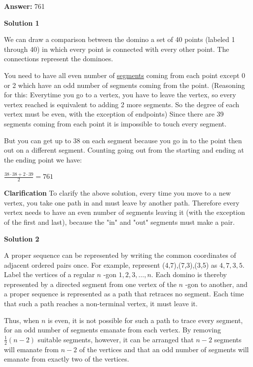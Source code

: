 \begin{enumerate}
 \textbf{Answer: }761



\textbf{Solution 1}

We can draw a comparison between the domino a set of 40 points (labeled 1 through 40) in which every point is connected with every other point. The connections represent the dominoes.

 You need to have all even number of \href{https://artofproblemsolving.com/wiki/index.php?title=Segment}{segments} coming from each point except 0 or 2 which have an odd number of segments coming from the point. (Reasoning for this: Everytime you go to a vertex, you have to leave the vertex, so every vertex reached is equivalent to adding 2 more segments. So the degree of each vertex must be even, with the exception of endpoints) Since there are 39 segments coming from each point it is impossible to touch every segment.

 But you can get up to 38 on each segment because you go in to the point then out on a different segment.  Counting going out from the starting and ending at the ending point we have:

 $\frac{38\cdot 38 + 2\cdot 39}2 = \boxed{761}$

 \textbf{Clarification} To clarify the above solution, every time you move to a new vertex, you take one path in and must leave by another path. Therefore every vertex needs to have an even number of segments leaving it (with the exception of the first and last), because the "in" and "out" segments must make a pair.

 



\textbf{Solution 2}

A proper sequence can be represented by writing the common coordinates of adjacent ordered pairs once. For example, represent (4,7),(7,3),(3,5) as $4,7,3,5 .$ Label the vertices of a regular $n$ -gon $1,2,3, \ldots, n .$ Each domino is thereby represented by a directed segment from one vertex of the $n$ -gon to another, and a proper sequence is represented as a path that retraces no segment. Each time that such a path reaches a non-terminal vertex, it must leave it. 

 
Thus, when $n$ is even, it is not possible for such a path to trace every segment, for an odd number of segments emanate from each vertex. By removing $\frac{1}{2}(n-2)$ suitable segments, however, it can be arranged that $n-2$ segments will emanate from $n-2$ of the vertices and that an odd number of segments will emanate from exactly two of the vertices. 


\end{enumerate}

